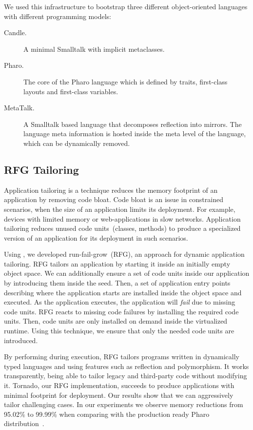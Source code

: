 We used this infrastructure to bootstrap three different object-oriented languages with different programming models: 
\begin{description}
\item[Candle.] A minimal Smalltalk with implicit metaclasses.
\item[Pharo.] The core of the Pharo language which is defined by traits, first-class layouts and first-class variables.
\item[MetaTalk.] A Smalltalk based language that decomposes reflection into mirrors. The language meta information is hosted inside the meta level of the language, which can be dynamically removed.
\end{description}

\subsection{RFG Tailoring} 

Application tailoring is a technique reduces the memory footprint of an application by removing code bloat. Code bloat is an issue in constrained scenarios, when the size of an application limits its deployment. For example, devices with limited memory or web-applications in slow networks. Application tailoring reduces unused code units~(\eg classes, methods) to produce a specialized version of an application for its deployment in such scenarios.

Using \Vtt, we developed run-fail-grow~(RFG), an approach for dynamic application tailoring. RFG tailors an application by starting it inside an initially empty object space. We can additionally ensure a set of code units inside our application by introducing them inside the seed. Then, a set of application entry points describing where the application starts are installed inside the object space and executed. As the application executes, the application will \emph{fail} due to missing code units. RFG reacts to missing code failures by installing the required code units. Then, code units are only installed on demand inside the virtualized runtime. Using this technique, we ensure that only the needed code units are introduced.

By performing during execution, RFG tailors programs written in dynamically typed languages and using features such as reflection and polymorphism. It works transparently, being able to tailor legacy and third-party code without modifying it. Tornado, our RFG implementation, succeeds to produce applications with minimal footprint for deployment. Our results show that we can aggressively tailor challenging cases. In our experiments we observe memory reductions from 95.02\% to 99.99\% when comparing with the production ready Pharo distribution~\cite{Poli14a}.

